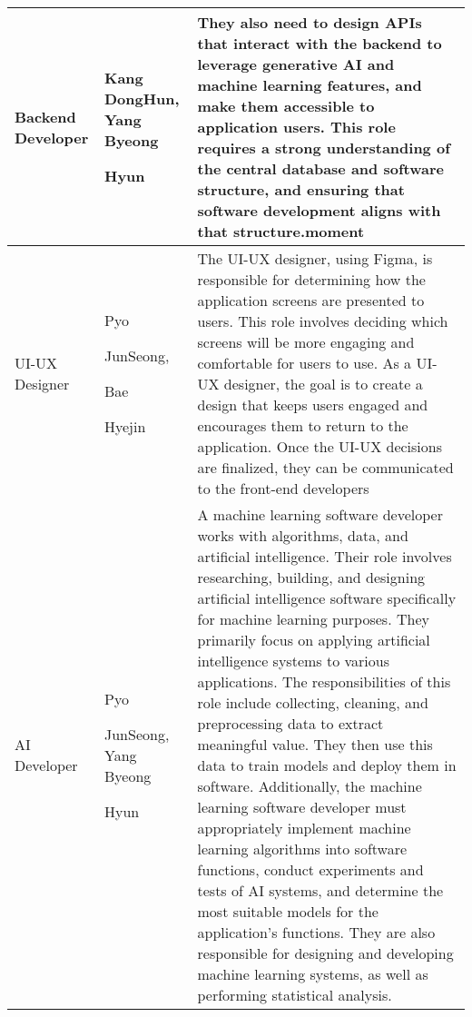 \documentclass[conference]{IEEEtran}
\begin{document}
\begin{enumerate}
\begin{itemize}
\begin{itemize}
\begin{enumerate}
\begin{table}
\def\arraystretch{1.24} \small 

\begin{tabular}{|p{1.2cm}|p{1.2cm}|p{5.2cm}|}
    \hline
    Backend Developer & Kang DongHun,  Yang Byeong \par Hyun & They also need to design APIs that interact with the backend to leverage generative AI and machine learning features, and make them accessible to application users. This role requires a strong understanding of the central database and software structure, and ensuring that software development aligns with that structure.moment \\ 
    \hline
    UI-UX Designer & Pyo \par JunSeong, \par Bae \par Hyejin & The UI-UX designer, using Figma, is responsible for determining how the application screens are presented to users. This role involves deciding which screens will be more engaging and comfortable for users to use. As a UI-UX designer, the goal is to create a design that keeps users engaged and encourages them to return to the application. Once the UI-UX decisions are finalized, they can be communicated to the front-end developers \\ 
    \hline
    AI Developer & Pyo \par JunSeong, Yang Byeong \par Hyun & A machine learning software developer works with algorithms, data, and artificial intelligence. Their role involves researching, building, and designing artificial intelligence software specifically for machine learning purposes. They primarily focus on applying artificial intelligence systems to various applications. The responsibilities of this role include collecting, cleaning, and preprocessing data to extract meaningful value. They then use this data to train models and deploy them in software. Additionally, the machine learning software developer must appropriately implement machine learning algorithms into software functions, conduct experiments and tests of AI systems, and determine the most suitable models for the application’s functions. They are also responsible for designing and developing machine learning systems, as well as performing statistical analysis. \\
    \hline
    \end{tabular}
    \\ \\ \\ \\ \\ \\ \\ \\ \\ \\ \\ \\ 


\end{table}
\end{enumerate}
\end{itemize}
\end{itemize}
\end{enumerate}
\end{document}
